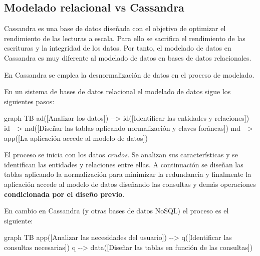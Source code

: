 \documentclass[
]{book}
\newenvironment{Shaded}{}{}
\newcommand{\NormalTok}[1]{#1}
\begin{document}
\subsection{Modelado relacional vs Cassandra}\label{modelado-relacional-vs-cassandra}

Cassandra es una base de datos diseñada con el objetivo de optimizar el rendimiento de las lecturas a escala. Para ello se sacrifica el rendimiento de las escrituras y la integridad de los datos. Por tanto, el modelado de datos en Cassandra es muy diferente al modelado de datos en bases de datos relacionales.

En Cassandra se emplea la desnormalización de datos en el proceso de modelado.

En un sistema de bases de datos relacional el modelado de datos sigue los siguientes pasos:

\begin{Shaded}
\begin{Highlighting}[]
\NormalTok{graph TB}
\NormalTok{ad([Analizar los datos]) {-}{-}\textgreater{} id([Identificar las}
\NormalTok{entidades y}
\NormalTok{relaciones])}
\NormalTok{id {-}{-}\textgreater{} md([Diseñar las tablas}
\NormalTok{aplicando normalización y}
\NormalTok{claves foráneas])}
\NormalTok{md {-}{-}\textgreater{} app([La aplicación accede}
\NormalTok{al modelo de datos])}
\end{Highlighting}
\end{Shaded}

El proceso se inicia con los datos \emph{crudos}. Se analizan sus características y se identifican las entidades y relaciones entre ellas. A continuación se diseñan las tablas aplicando la normalización para minimizar la redundancia y finalmente la aplicación accede al modelo de datos diseñando las consultas y demás operaciones \textbf{condicionada por el diseño previo}.

En cambio en Cassandra (y otras bases de datos NoSQL) el proceso es el siguiente:

\begin{Shaded}
\begin{Highlighting}[]
\NormalTok{graph TB}
\NormalTok{app([Analizar las}
\NormalTok{necesidades del}
\NormalTok{usuario]) {-}{-}\textgreater{} q([Identificar las}
\NormalTok{consultas necesarias])}
\NormalTok{q {-}{-}\textgreater{} data([Diseñar las tablas}
\NormalTok{en función de}
\NormalTok{las consultas])}
\end{Highlighting}
\end{Shaded}
\end{document}
